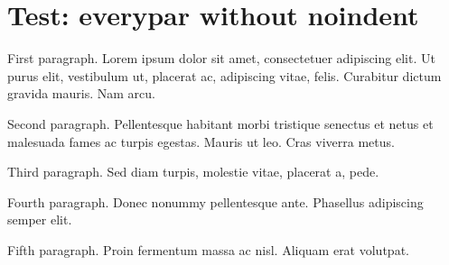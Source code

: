 \documentclass[11pt,a4paper]{article}
\begin{document}
\section{Test: everypar without noindent}

%
First paragraph. Lorem ipsum dolor sit amet, consectetuer adipiscing elit. Ut purus elit, vestibulum ut, placerat ac, adipiscing vitae, felis. Curabitur dictum gravida mauris. Nam arcu.

Second paragraph. Pellentesque habitant morbi tristique senectus et netus et malesuada fames ac turpis egestas. Mauris ut leo. Cras viverra metus.

Third paragraph. Sed diam turpis, molestie vitae, placerat a, pede.

Fourth paragraph. Donec nonummy pellentesque ante. Phasellus adipiscing semper elit.

Fifth paragraph. Proin fermentum massa ac nisl. Aliquam erat volutpat.

\everypar{}%
\end{document}
